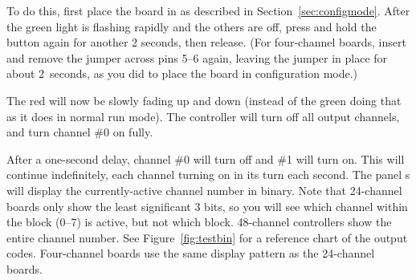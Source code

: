 \documentclass[letterpaper,twoside,onecolumn,openright,final]{memoir}
\begin{document}
To do this, first place the board in  as described in Section~\ref{sec:configmode}.
After the green light is flashing rapidly and the others are off, press and hold the  button
again %
for another 2 seconds, then release.  (For four-channel boards, insert and remove the jumper across pins
5--6 again, leaving the jumper in place for about 2~seconds, as you did to place the board in configuration
mode.)

The red  will now be slowly fading up and down (instead of the green  doing that
as it does in normal run mode).  The controller will turn off all output channels, and turn channel \#0
on fully.  

After a one-second delay, channel \#0 will turn off and \#1 will turn on.  This will continue indefinitely,
each channel turning on in its turn each second.  The panel s will display the currently-active
channel number in binary.  Note that 24-channel boards only show the least significant 3 bits, so you
will see which channel within the block (0--7) is active, but not which block.  48-channel controllers
show the entire channel number.  See Figure~\ref{fig:testbin} for a reference chart of the output
codes.  Four-channel boards use the same display pattern as the 24-channel boards.
\end{document}
